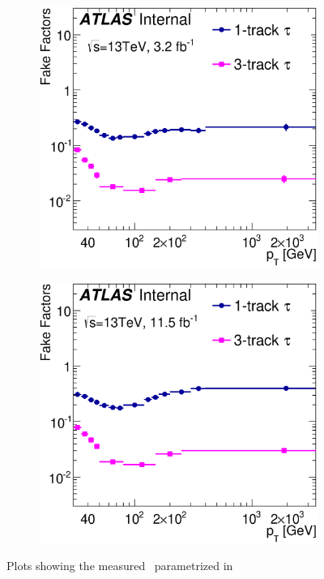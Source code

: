 \begin{figure}[!h]
\begin{subfigure}{0.5\textwidth}
   \includegraphics[width=\textwidth]{figures/GetTauFFmed2D_2015.eps}
\caption{}
\label{fig:ffA}
\end{subfigure} %
\begin{subfigure}{0.5\textwidth}
   \includegraphics[width=\textwidth]{figures/GetTauFFmed2D_2016.eps}
\caption{}
\label{fig:ffB}
\end{subfigure}
\caption{Plots showing the measured \FF\ parametrized in \tauvis\ \pt}
\label{fig:ff}
\end{figure}


